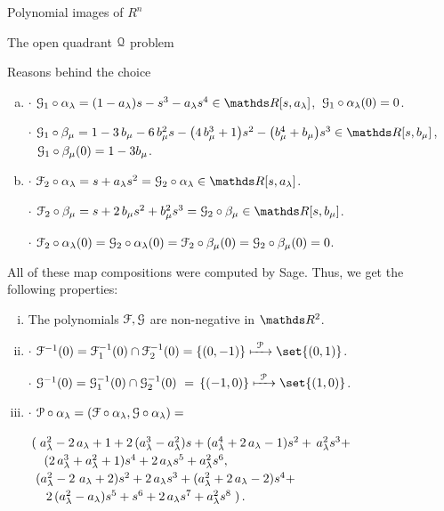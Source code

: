 \documentclass[11pt, a4paper, english, twoside, notitlepage, openright]{report}
\begin{document}
\begin{chapter}{Polynomial images of $R^n$}
\begin{section}{The open quadrant $\mathcal{Q}$ problem}
\begin{subsection}{Reasons behind the choice}
\begin{enumerate}[(a)]
\item $\cdot$ $ \G_1\circ\alpha_{\lambda } = {\left(1-a_{\lambda} \right)}s-s^{3}-a_{\lambda} s^{4} \in\R[s,a_{\lambda}]$,
$\, \mathcal{G}_1\circ\alpha_{\lambda }(0)=0$.

$\cdot$ $\G_1\circ\beta_{\mu}=1-3\, b_{\mu}-6\,b_{\mu}^{2}s-{\left(4\,b_{\mu}^{3}+1\right)}s^{2}-{\left(b_{\mu}^{4}+ b_{\mu}\right)}s^{3}\in\R[s,b_{\mu}]$,  $\ \ \G_1\circ\beta_{\mu}(0)=1-3b_{\mu}$.
		
\item $\cdot$ $\F_2\circ\alpha_{\lambda }= s+a_{\lambda} s^{2} = \G_2\circ\alpha_{\lambda}\in\R[s,a_{\lambda }]$.
			
$\cdot$ $\F_2\circ\beta_{\mu}= s+2 \, b_{\mu} s^{2}+b_{\mu}^{2} s^{3} = \G_2\circ\beta_{\mu}\in\R[s,b_{\mu}]$.
				
$\cdot$ $\mathcal{F}_2\circ\alpha_{\lambda }(0)=\mathcal{G}_2\circ\alpha_{\lambda}(0)=\mathcal{F}_2\circ\beta_{\mu}(0)=\mathcal{G}_2\circ\beta_{\mu}(0)=0$.
\end{enumerate}
All of these map compositions were computed by Sage. Thus, we get the following properties:
		
\begin{enumerate}[(i)]
		
\item The polynomials $\mathcal{F},\mathcal{G}$ are non-negative in $\R^2$.
		
\item $\cdot$ $\F^{-1}(0)=\F_1^{-1}(0)\cap \F_2^{-1}(0)=\{(0,-1)\}\xmapsto{\ \P\ }\set{(0,1)}$.
			
$\cdot$ $\G^{-1}(0)=\G_1^{-1}(0)\cap \G_2^{-1}(0)\ =\, \{(-1,0)\} \xmapsto{\ \P\ } \set{(1,0)}$.
		
\item $\cdot$ $\mathcal{P}\circ\alpha_{\lambda}=(\mathcal{F}\circ\alpha_{\lambda },\mathcal{G}\circ\alpha_{\lambda})=$
			
$\arraycolsep=2pt\def\arraystretch{1.2}
\begin{array}{l}
\left(\right.a_{\lambda}^{2}-2 \,a_{\lambda}+1+2 \,{(a_{\lambda}^{3}-a_{\lambda}^{2})}s+{(a_{\lambda}^{4}+2 \, a_{\lambda}-1)} s^{2}+ \,a_{\lambda}^{2} s^{3}+\\
\quad {(2\, a_{\lambda}^{3}+a_{\lambda}^{2}+1)}s^{4}+2 \,a_{\lambda} s^{5}+a_{\lambda}^{2} s^{6},\\		
\ {(a_{\lambda}^{2}-2 \ a_{\lambda}+2)} s^{2}+2 \, a_{\lambda} s^{3}+{(a_{\lambda}^{2}+2 \,a_{\lambda}-2)}s^{4}+\\
\quad \,2 \,{(a_{\lambda}^{2}-a_{\lambda})}s^{5}+s^{6}+2\,a_{\lambda} s^{7}+a_{\lambda}^{2}s^{8}\left.\right).
\end{array}
$
				

\end{enumerate}
\end{subsection}
\end{section}
\end{chapter}
\end{document}
